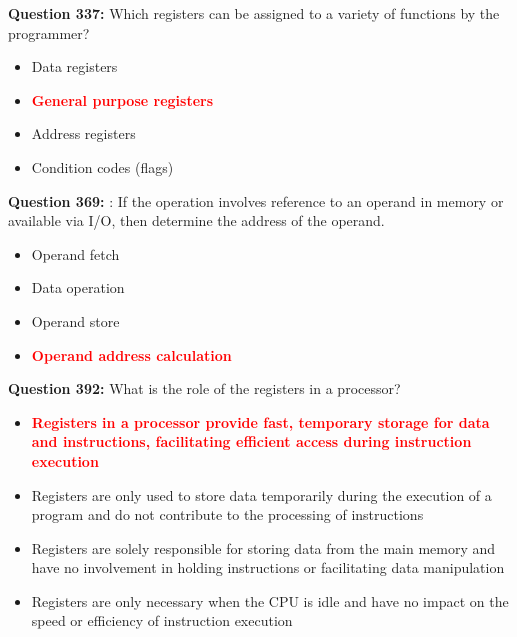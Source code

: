 \documentclass[12pt,a4paper]{article}
\begin{document}
\textbf{Question 337:} Which registers can be assigned to a variety of functions by the programmer?

\begin{itemize}
    \item[\textbf{A.}] Data registers
    \item[\textbf{B.}] \textcolor{red}{\textbf{General purpose registers}}
    \item[\textbf{C.}] Address registers
    \item[\textbf{D.}] Condition codes (flags)
\end{itemize}

\vspace{0.5cm}

\vspace{0.5cm}

\textbf{Question 369:} \underline{\hspace{1.5cm}}: If the operation involves reference to an operand in memory or available via I/O, then determine the address of the operand.

\begin{itemize}
    \item[\textbf{A.}] Operand fetch
    \item[\textbf{B.}] Data operation
    \item[\textbf{C.}] Operand store
    \item[\textbf{D.}] \textcolor{red}{\textbf{Operand address calculation}}
\end{itemize}

\vspace{0.5cm}

\vspace{0.5cm}

\textbf{Question 392:} What is the role of the registers in a processor?

\begin{itemize}
    \item[\textbf{A.}] \textcolor{red}{\textbf{Registers in a processor provide fast, temporary storage for data and instructions, facilitating efficient access during instruction execution}}
    \item[\textbf{B.}] Registers are only used to store data temporarily during the execution of a program and do not contribute to the processing of instructions
    \item[\textbf{C.}] Registers are solely responsible for storing data from the main memory and have no involvement in holding instructions or facilitating data manipulation
    \item[\textbf{D.}] Registers are only necessary when the CPU is idle and have no impact on the speed or efficiency of instruction execution
\end{itemize}
\end{document}
